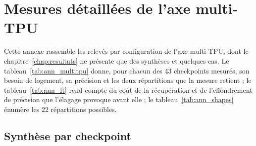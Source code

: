 
\chapter{Mesures détaillées de l'axe multi-TPU}
\label{ann:multitpu}

Cette annexe rassemble les relevés par configuration de l'axe multi-TPU, dont le chapitre~\ref{chap:resultats} ne présente que des synthèses et quelques cas. Le tableau~\ref{tab:ann_multitpu} donne, pour chacun des 43 checkpoints mesurés, son besoin de logement, sa précision et les deux répartitions que la mesure retient ; le tableau~\ref{tab:ann_ft} rend compte du coût de la récupération et de l'effondrement de précision que l'élagage provoque avant elle ; le tableau~\ref{tab:ann_shapes} énumère les 22 répartitions possibles.

\section{Synthèse par checkpoint}

